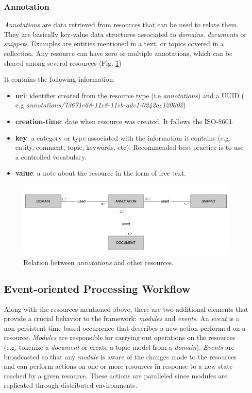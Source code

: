 \subsubsection{Annotation}

\textit{Annotations} are data retrieved from resources that can be used to relate them. They are basically key-value data structures associated to \textit{domains}, \textit{documents} or \textit{snippets}. Examples are entities mentioned in a text, or topics covered in a collection. Any resource can have zero or multiple annotations, which can be shared among several resources (Fig. \ref{fig:librairy-model-annotation})

It contains the following information:
\begin{itemize}
\item \textbf{uri}: identifier created from the resource type (i.e \textit{annotations}) and a UUID ( e.g \textit{annotations/73671e68-11c8-11eb-adc1-0242ac120002})
\item \textbf{creation-time}: date when resource was created. It follows the ISO-8601.
\item \textbf{key}: a category or type associated with the information it contains (e.g. entity, comment, topic, keywords, etc). Recommended best practice is to use a controlled vocabulary.
\item \textbf{value}: a note about the resource in the form of free text.
\end{itemize}

\begin{figure}
  \center
  \includegraphics[scale=0.4]{model-annotation.png}
  \caption{Relation between \textit{annotations} and other resources.}
  \label{fig:librairy-model-annotation}
\end{figure}

\subsection{Event-oriented Processing Workflow}

Along with the resources mentioned above, there are two additional elements that provide a crucial behavior to the framework: \textit{modules} and \textit{events}. An \textit{event} is a non-persistent time-based occurrence that describes a new action performed on a resource. \textit{Modules} are responsible for carrying out operations on the resources (e.g. tokenize a \textit{document} or create a topic model from a \textit{domain}). \textit{Events} are broadcasted so that any \textit{module} is aware of the changes made to the resources and  can perform actions on one or more resources in response to a new state reached by a given resource. These actions are paralleled since modules are replicated through distributed environments.

